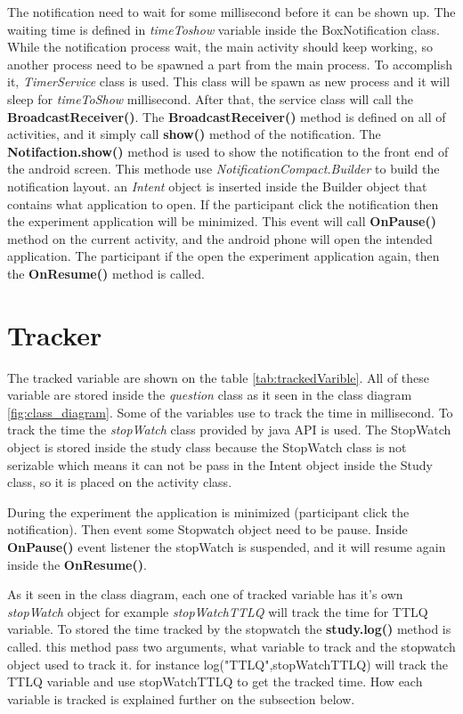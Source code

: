 The notification need to wait for some millisecond before it can be shown up. The waiting time is defined in \textit{timeToshow} variable inside the BoxNotification class.
While the notification process wait, the main activity should keep working, so another process need to be spawned a part from the main process.
To accomplish it, \textit{TimerService} class is used. This class will be spawn as new process and it will sleep for \textit{timeToShow} millisecond.
After that, the service class will call the \textbf{BroadcastReceiver()}.
The \textbf{BroadcastReceiver()} method  is defined on all of activities, and it simply call \textbf{show()} method of the notification.
The \textbf{Notifaction.show()} method is used to show  the notification to the front end of the android screen. This methode use
 \textit{NotificationCompact.Builder} to build the notification layout.
 an \textit{Intent} object is inserted inside the Builder object that contains what application to open.
 If the participant click the notification then the experiment application will be minimized.
 This event will call \textbf{OnPause()} method on the current activity, and the android phone will open the intended application.
 The participant if the open the experiment application again, then the \textbf{OnResume()} method is called.


\section{Tracker}

The tracked variable are shown on the table \ref{tab:trackedVarible}.
All of these variable are stored inside the \textit{question} class as it seen in the class diagram \ref{fig:class_diagram}.
Some of the variables use to track the time in millisecond.
To track the time the \textit{stopWatch} class provided by java API is used.
The StopWatch object is stored inside the study class because the StopWatch class is not serizable which means
it can not be pass in the Intent object inside the Study class, so it is placed on the activity class.

During the experiment the application is minimized (participant click the notification).
Then event some Stopwatch object need to be pause. Inside \textbf{OnPause()} event listener the stopWatch is suspended,
and it will resume again inside the \textbf{OnResume()}.

As it seen in the class diagram, each one of tracked variable has it's own \textit{stopWatch} object for example \textit{stopWatchTTLQ} will track the time for TTLQ variable.
To stored the time tracked by the stopwatch the \textbf{study.log()} method is called.
this method pass two arguments, what variable to track and the stopwatch object used to track it.
for instance log("TTLQ",stopWatchTTLQ) will track the TTLQ variable and use stopWatchTTLQ to get the tracked time.
How each variable is tracked is explained further on the subsection below.

